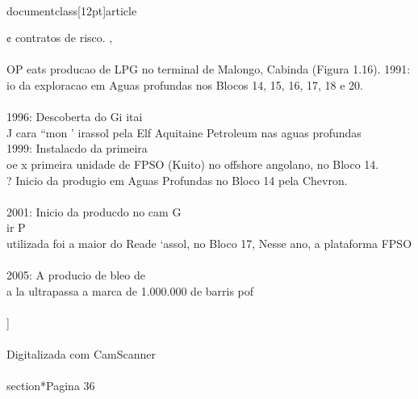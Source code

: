 \\documentclass[12pt]{article}
\begin{document}
{¢ contratos de risco. ,\\
\\
OP eats producao de LPG no terminal de Malongo, Cabinda (Figura 1.16). 1991:\\
io da exploracao em Aguas profundas nos Blocos 14, 15, 16, 17, 18 e 20.\\
\\
1996: Descoberta do Gi itai\\
J cara “mon ' irassol pela Elf Aquitaine Petroleum nas aguas profundas\\
1999: Instalacdo da primeira\\
oe x primeira unidade de FPSO (Kuito) no offshore angolano, no Bloco 14.\\
? Inicio da produgio em Aguas Profundas no Bloco 14 pela Chevron.\\
\\
2001: Inicio da producdo no cam G\\
ir P\\
utilizada foi a maior do Reade ‘assol, no Bloco 17, Nesse ano, a plataforma FPSO\\
\\
2005: A producio de bleo de\\
a la ultrapassa a marca de 1.000.000 de barris pof\\
\\
]\\
\\
Digitalizada com CamScanner\\

\\section*{Pagina 36}

}
\end{document}
